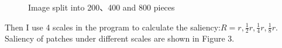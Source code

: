 \documentclass[10pt,twocolumn,letterpaper]{article}
\begin{document}
 \begin{figure}[h]
	\centering
 	\caption{ Image split into 200、400 and 800 pieces}
 	
 	
 \end{figure}
 
 \indent \indent Then I use 4 scales in the program to calculate the saliency:$R = r, \frac{1}{2}r, \frac{1}{4}r, \frac{1}{8}r$. Saliency of patches under different
 scales are shown in Figure 3.
 
\end{document}

